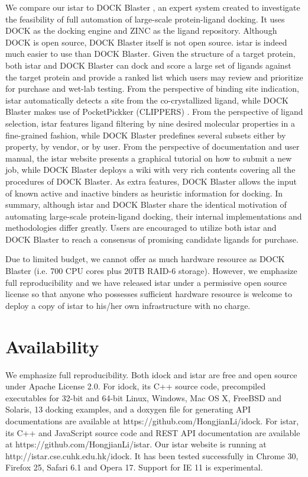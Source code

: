 \documentclass[10pt]{article}
\begin{document}
We compare our istar to DOCK Blaster \cite{557}, an expert system created to investigate the feasibility of full automation of large-scale protein-ligand docking. It uses DOCK \cite{1222} as the docking engine and ZINC \cite{532,1178} as the ligand repository. Although DOCK is open source, DOCK Blaster itself is not open source. istar is indeed much easier to use than DOCK Blaster. Given the structure of a target protein, both istar and DOCK Blaster can dock and score a large set of ligands against the target protein and provide a ranked list which users may review and prioritize for purchase and wet-lab testing. From the perspective of binding site indication, istar automatically detects a site from the co-crystallized ligand, while DOCK Blaster makes use of PocketPickker (CLIPPERS) \cite{395}. From the perspective of ligand selection, istar features ligand filtering by nine desired molecular properties in a fine-grained fashion, while DOCK Blaster predefines several subsets either by property, by vendor, or by user. From the perspective of documentation and user manual, the istar website presents a graphical tutorial on how to submit a new job, while DOCK Blaster deploys a wiki with very rich contents covering all the procedures of DOCK Blaster. As extra features, DOCK Blaster allows the input of known active and inactive binders as heuristic information for docking. In summary, although istar and DOCK Blaster share the identical motivation of automating large-scale protein-ligand docking, their internal implementations and methodologies differ greatly. Users are encouraged to utilize both istar and DOCK Blaster to reach a consensus of promising candidate ligands for purchase.

Due to limited budget, we cannot offer as much hardware resource as DOCK Blaster (i.e. 700 CPU cores plus 20TB RAID-6 storage). However, we emphasize full reproducibility and we have released istar under a permissive open source license so that anyone who possesses sufficient hardware resource is welcome to deploy a copy of istar to his/her own infrastructure with no charge.

\section*{Availability}
We emphasize full reproducibility. Both idock and istar are free and open source under Apache License 2.0. For idock, its C++ source code, precompiled executables for 32-bit and 64-bit Linux, Windows, Mac OS X, FreeBSD and Solaris, 13 docking examples, and a doxygen file for generating API documentations are available at https://github.com/HongjianLi/idock. For istar, its C++ and JavaScript source code and REST API documentation are available at https://github.com/HongjianLi/istar. Our istar website is running at http://istar.cse.cuhk.edu.hk/idock. It has been tested successfully in Chrome 30, Firefox 25, Safari 6.1 and Opera 17. Support for IE 11 is experimental.
\end{document}
